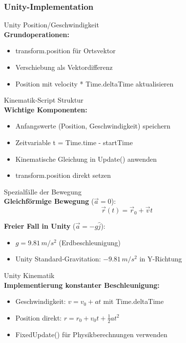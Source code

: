 \subsubsection{Unity-Implementation}


\begin{concept}{Unity Position/Geschwindigkeit}\\
    \textbf{Grundoperationen:}
    \begin{itemize}
        \item transform.position für Ortsvektor
        \item Verschiebung als Vektordifferenz
        \item Position mit velocity * Time.deltaTime aktualisieren
    \end{itemize}
\end{concept}

\begin{concept}{Kinematik-Script Struktur}\\
    \textbf{Wichtige Komponenten:}
    \begin{itemize}
        \item Anfangswerte (Position, Geschwindigkeit) speichern
        \item Zeitvariable t = Time.time - startTime
        \item Kinematische Gleichung in Update() anwenden
        \item transform.position direkt setzen
    \end{itemize}
\end{concept}

\begin{concept}{Spezialfälle der Bewegung}\\
    \textbf{Gleichförmige Bewegung} ($\vec{a} = 0$):
    $$\vec{r}(t) = \vec{r}_0 + \vec{v}t$$
    
    \textbf{Freier Fall in Unity} ($\vec{a} = -g\hat{j}$):
    \begin{itemize}
        \item $g = 9.81 \, m/s^2$ (Erdbeschleunigung)
        \item Unity Standard-Gravitation: $-9.81 \, m/s^2$ in Y-Richtung
    \end{itemize}
\end{concept}

\begin{concept}{Unity Kinematik}\\
    \textbf{Implementierung konstanter Beschleunigung:}
    \begin{itemize}
        \item Geschwindigkeit: $v = v_0 + at$ mit Time.deltaTime
        \item Position direkt: $r = r_0 + v_0t + \frac{1}{2}at^2$
        \item FixedUpdate() für Physikberechnungen verwenden
    \end{itemize}
\end{concept}

